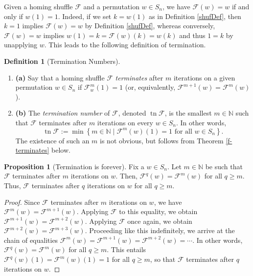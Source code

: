 \documentclass[final,nomarks]{dmtcs-episciences}
\theoremstyle{definition}
\newtheorem{prop}[thm]{Proposition}
\theoremstyle{definition}
\newtheorem{defn}[thm]{Definition}
\theoremstyle{remark}
\newcommand{\f}{\mathcal{F}} %
\newcommand{\tn}{\operatorname{tn }} %
\newcommand{\tup}[1]{\left( #1 \right)}
\newcommand{\set}[1]{\left\{ #1 \right\}}
\begin{document}
Given a homing shuffle $\f$ and a permutation $w \in S_n$, we have $\f\tup{w} = w$ if and only if $w\tup{1} = 1$. Indeed, if we set $k = w\tup{1}$ as in Definition \ref{shufDef}, then $k = 1$ implies $\f\tup{w} = w$ by Definition \ref{shufDef}, whereas conversely, $\f\tup{w} = w$ implies $w\tup{1} = k = \f\tup{w}\tup{k} = w\tup{k}$ and thus $1 = k$ by unapplying $w$. This leads to the following definition of termination.

\begin{defn}[Termination Numbers] \ \\ \vspace{-1pc}
    \begin{enumerate}[]
        \item\textbf{(a)} Say that a homing shuffle $ \f $ \emph{terminates} after $m$ iterations on a given permutation $w \in S_n$ if $ \f^{ m }_w\tup{ 1 }=1 $ (or, equivalently, $\f^{m+1}\tup{w} = \f^m\tup{w}$).
        \item\textbf{(b)} The \emph{termination number} of $ \f $, denoted $ \tn \f $, is the smallest $ m \in \mathbb{N} $ such that $ \f $ terminates after $m$ iterations on every $ w \in S_{n} $. In other words,
    \[
    \tn\f := \min\set{m \in \mathbb{N} \;|\; \f^{m}\tup{ w }\tup{ 1 } = 1 \text{ for all }  w \in S_{n}} .
    \]
    The existence of such an $m$ is not obvious, but follows from Theorem \ref{f-terminates} below.
    \end{enumerate}
\end{defn}

\begin{prop}[Termination is forever]
    \label{termPr}
   Fix a $ w \in S_{n} $.
   Let $m \in \mathbb{N}$ be such that $\f$ terminates after $m$ iterations on $w$.
   Then, $ \f^{q}\tup{ w } = \f^{m}\tup{ w } $ for all $ q \geq m $.
   Thus, $\f$ terminates after $q$ iterations on $w$ for all $q \geq m$.
\end{prop}
\begin{proof}
   Since $\f$ terminates after $m$ iterations on $w$, we have $\f^m\tup{w} = \f^{m+1}\tup{w}$.
   Applying $\f$ to this equality, we obtain
   $\f^{m+1}\tup{w} = \f^{m+2}\tup{w}$.
   Applying $\f$ once again, we obtain
   $\f^{m+2}\tup{w} = \f^{m+3}\tup{w}$.
   Proceeding like this indefinitely, we arrive at the chain of equalities
   $\f^m\tup{w} = \f^{m+1}\tup{w} = \f^{m+2}\tup{w} = \cdots$.
   In other words, $ \f^{q}\tup{ w } = \f^{m}\tup{ w } $ for all $ q \geq m $.
   This entails $ \f^{q}\tup{ w }\tup{1} = \f^{m}\tup{ w } \tup{1} = 1$ for all $q \geq m$, so that $\f$ terminates after $q$ iterations on $w$.
\end{proof}
\end{document}
